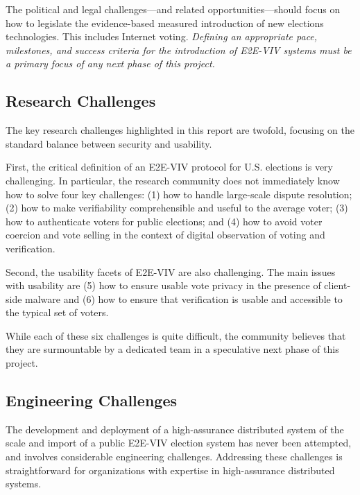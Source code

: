 The political and legal challenges---and related
opportunities---should focus on how to legislate the evidence-based
measured introduction of new elections technologies. This includes
Internet voting. \emph{Defining an appropriate pace, milestones, and
  success criteria for the introduction of E2E-VIV systems must be a
  primary focus of any next phase of this project.}

\subsection{Research Challenges}

The key research challenges highlighted in this report are twofold,
focusing on the standard balance between security and usability.

First, the critical definition of an E2E-VIV protocol for
U.S. elections is very challenging. In particular, the research
community does not immediately know how to solve four key challenges:
(1) how to handle large-scale dispute resolution; (2) how to make
verifiability comprehensible and useful to the average voter; (3) how
to authenticate voters for public elections; and (4) how to avoid
voter coercion and vote selling in the context of digital observation
of voting and verification.

Second, the usability facets of E2E-VIV are also challenging. The main
issues with usability are (5) how to ensure usable vote privacy in the
presence of client-side malware and (6) how to ensure that
verification is usable and accessible to the typical set of voters.

While each of these six challenges is quite difficult, the community
believes that they are surmountable by a dedicated team in a
speculative next phase of this project.

\subsection{Engineering Challenges}

The development and deployment of a high-assurance distributed system
of the scale and import of a public E2E-VIV election system has never
been attempted, and involves considerable engineering
challenges. Addressing these challenges is straightforward for
organizations with expertise in high-assurance distributed systems.

